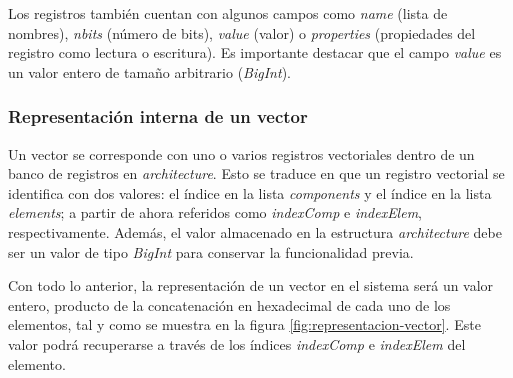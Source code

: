 Los registros también cuentan con algunos campos como \textit{name} (lista de nombres), \textit{nbits} (número de bits), \textit{value} (valor) o \textit{properties} (propiedades del registro como lectura o escritura). Es importante destacar que el campo \textit{value} es un valor entero de tamaño arbitrario (\textit{BigInt}).

\subsubsection{Representación interna de un vector}

Un vector se corresponde con uno o varios registros vectoriales dentro de un
banco de registros en \textit{architecture}. Esto se traduce en que un registro
vectorial se identifica con dos valores: el índice en la lista
\textit{components} y el índice en la lista \textit{elements}; a partir de
ahora referidos como \textit{indexComp} e \textit{indexElem}, respectivamente.
Además, el valor almacenado en la estructura \textit{architecture} debe ser un
valor de tipo \textit{BigInt} para conservar la funcionalidad previa.

Con todo lo anterior, la representación de un vector en el sistema será un
valor entero, producto de la concatenación en hexadecimal de cada uno de los
elementos, tal y como se muestra en la figura
\ref{fig:representacion-vector}. Este valor podrá recuperarse a través de los
índices \textit{indexComp} e \textit{indexElem} del elemento.

